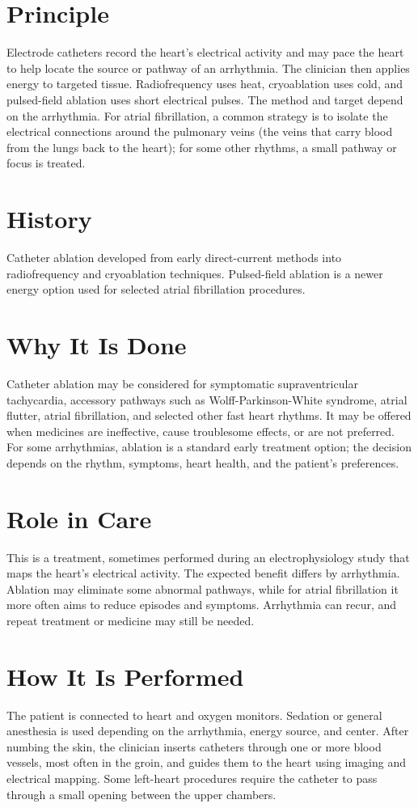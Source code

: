 \section*{Principle}
Electrode catheters record the heart's electrical activity and may pace the heart to help locate the source or pathway of an arrhythmia. The clinician then applies energy to targeted tissue. Radiofrequency uses heat, cryoablation uses cold, and pulsed-field ablation uses short electrical pulses. The method and target depend on the arrhythmia. For atrial fibrillation, a common strategy is to isolate the electrical connections around the pulmonary veins (the veins that carry blood from the lungs back to the heart); for some other rhythms, a small pathway or focus is treated.

\section*{History}
Catheter ablation developed from early direct-current methods into radiofrequency and cryoablation techniques. Pulsed-field ablation is a newer energy option used for selected atrial fibrillation procedures.

\section*{Why It Is Done}
Catheter ablation may be considered for symptomatic supraventricular tachycardia, accessory pathways such as Wolff-Parkinson-White syndrome, atrial flutter, atrial fibrillation, and selected other fast heart rhythms. It may be offered when medicines are ineffective, cause troublesome effects, or are not preferred. For some arrhythmias, ablation is a standard early treatment option; the decision depends on the rhythm, symptoms, heart health, and the patient's preferences.

\section*{Role in Care}
This is a treatment, sometimes performed during an electrophysiology study that maps the heart's electrical activity. The expected benefit differs by arrhythmia. Ablation may eliminate some abnormal pathways, while for atrial fibrillation it more often aims to reduce episodes and symptoms. Arrhythmia can recur, and repeat treatment or medicine may still be needed.

\section*{How It Is Performed}
The patient is connected to heart and oxygen monitors. Sedation or general anesthesia is used depending on the arrhythmia, energy source, and center. After numbing the skin, the clinician inserts catheters through one or more blood vessels, most often in the groin, and guides them to the heart using imaging and electrical mapping. Some left-heart procedures require the catheter to pass through a small opening between the upper chambers.

